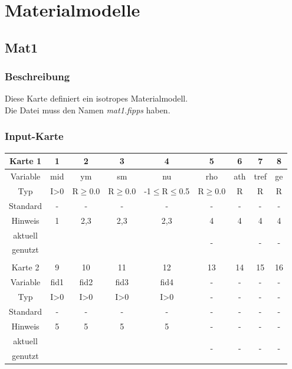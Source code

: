 \documentclass[11pt,titlepage,listof=totoc,bibliography=totoc,twoside]{scrreprt}
\begin{document}
{{\newpage

\section{Materialmodelle}

\subsection{Mat1}

\subsubsection{Beschreibung}

Diese Karte definiert ein isotropes Materialmodell.\\
Die Datei muss den Namen \emph{mat1.fipps} haben.

\subsubsection{Input-Karte}

\begin{table}[htbp]
\centering
\begin{tabularx}{\textwidth}{cCCCcCCCC}
\toprule
Karte 1	& 1		& 2		& 3		& 4			& 5		& 6		& 7		& 8	\\
\midrule
Variable& mid		& ym		& sm		& nu			& rho		& ath		& tref		& ge	\\
Typ	& I>0		& R$\ge$0.0	& R$\ge$0.0	& -1$\le$R$\le$0.5	& R$\ge$0.0	& R		& R		& R	\\
Standard& -		& -		& -		& -			& -		& -		& -		& -	\\
Hinweis	& 1		& 2,3		& 2,3		& 2,3			& 4		& 4		& 4		& 4	\\
aktuell	& 	& 	& 	& 	& 	& 	& \multirow{2}{*}{-}	& 	\\
genutzt \\
\\
Karte 2	& 9		& 10		& 11		& 12			& 13		& 14		& 15		& 16		\\
\midrule
Variable& fid1		& fid2		& fid3		& fid4			& -		& -		& -		& -		\\
Typ	& I>0		& I>0		& I>0		& I>0			& -		& -		& -		& -		\\
Standard& -		& -		& -		& -			& -		& -		& -		& -		\\
Hinweis	& 5		& 5		& 5		& 5			& -		& -		& -		& -		\\
aktuell	& 	& 	& 	& 	& 	& \multirow{2}{*}{-}	& 	& 	\\
genutzt \\
\bottomrule
\end{tabularx}
\end{table}

}}
\end{document}
